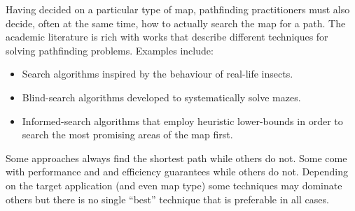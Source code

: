 Having decided on a particular type of map, pathfinding practitioners must also decide, often
at the same time, how to actually search the map for a path.
The academic literature is rich with works that describe different 
techniques for solving pathfinding problems. Examples include:
\begin{itemize}
\item Search algorithms inspired by the behaviour of real-life insects.
\item Blind-search algorithms developed to systematically solve mazes.
\item Informed-search algorithms that employ heuristic lower-bounds in order
to search the most promising areas of the map first.
\end{itemize}

\noindent Some approaches always find the shortest path while others do not. Some come with performance and and 
efficiency guarantees while others do not. Depending on the target application (and even map type)
some techniques may dominate others but there is no single ``best'' technique that is preferable in all cases.

